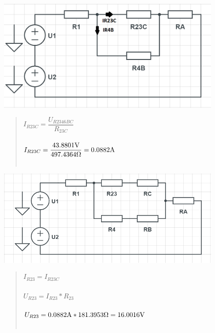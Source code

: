 \begin{figure}[H]
    \centering
    \includegraphics[scale=0.45]{pic1/u1o5.png}
    \begin{quote}
    \centering
    $I_{R23C} = \dfrac{U_{R2346BC}}{R_{23C}} $ \\~\\
	$I_{R23C} = \dfrac{43.8801\Vo}{497.4364\Omega} = 0.0882\Am $ \\~\\
    \end{quote}
\end{figure}
\begin{figure}[H]
    \centering
    \includegraphics[scale=0.6]{pic1/u1o6 .png}
    \begin{quote}
    \centering
    $I_{R23} = I_{R23C}$ \\~\\
	$U_{R23} = I_{R23}*R_{23} $ \\~\\
	$U_{R23} = 0.0882\Am * 181.3953\Omega = 16.0016\Vo $ \\~\\
    \end{quote}
\end{figure}
